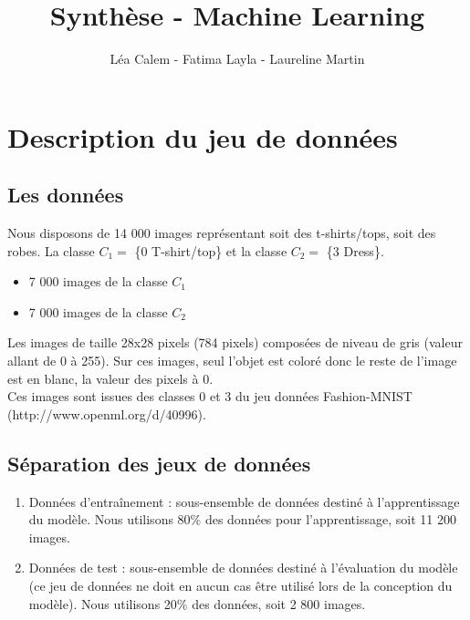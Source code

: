 \documentclass[a4paper,10pt]{article}
\title{Synthèse - Machine Learning}
\author{Léa Calem - Fatima Layla - Laureline Martin}
\begin{document}
\maketitle
	
\section{Description du jeu de données}
	\subsection{Les données}
		Nous disposons de 14 000 images représentant soit des t-shirts/tops, soit des robes. La classe $C_1 =$ \{0 T-shirt/top\} et la classe $C_2 =$ \{3 Dress\}.
		\begin{itemize}
			\item 7 000 images de la classe $C_1$
			\item 7 000 images de la classe $C_2$
		\end{itemize}
		Les images de taille 28x28 pixels (784 pixels) composées de niveau de gris (valeur allant de 0 à 255). Sur ces images, seul l’objet est coloré donc le reste de l’image est en blanc, la valeur des pixels à 0.\\
		Ces images sont issues des classes 0 et 3 du jeu données Fashion-MNIST (http://www.openml.org/d/40996). 
	\subsection{Séparation des jeux de données}
		\begin{enumerate}
			\item Données d’entraînement : sous-ensemble de données destiné à l’apprentissage du modèle. Nous utilisons 80\% des données pour l'apprentissage, soit 11 200 images.
			\item Données de test : sous-ensemble de données destiné à l’évaluation du modèle (ce jeu de données ne doit en aucun cas être utilisé lors de la conception du modèle). Nous utilisons 20\% des données, soit 2 800 images.
		\end{enumerate}
\end{document}
